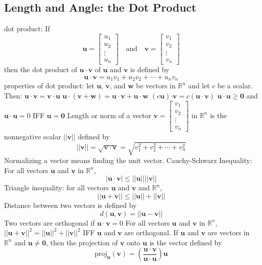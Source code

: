 \documentclass{article}
\begin{document}
    \subsection{Length and Angle: the Dot Product}
    \begin{outline}
        \1 dot product: If \[\mathbf u=\begin{bmatrix}u_1\\u_2\\\vdots\\u_n\end{bmatrix}\quad\text{and}\quad\mathbf v=\begin{bmatrix}v_1\\v_2\\\vdots\\v_n\end{bmatrix}\] then the dot product of \(\mathbf u\cdot\mathbf v\) of \(\mathbf u\) and \(\mathbf v\) is defined by \[\mathbf u\cdot\mathbf v=u_1v_1+u_2v_2+\cdots+u_nv_n\]
        \1 properties of dot product: let \(\mathbf u\), \(\mathbf v\), and \(\mathbf w\) be vectors in \(\mathbb R^n\) and let $c$ be a scalar. Then: 
            \2 \(\mathbf{u\cdot v}=\mathbf{v\cdot u}\)
            \2 \(\mathbf{u\cdot}(\mathbf{v+w})=\mathbf{u\cdot v+u\cdot w}\)
            \2 \((c\mathbf u)\mathbf{\cdot v}=c(\mathbf{u\cdot v})\)
            \2 \(\mathbf{u\cdot u\geq 0}\) and \(\mathbf{u\cdot u}=0\) IFF \(\mathbf u=\mathbf 0\)
            \2 Length or norm of a vector \(\mathbf v=\begin{bmatrix}v_1\\v_2\\\vdots\\v_n\end{bmatrix}\) in \(\mathbb R^n\) is the nonnegative scalar \(||\mathbf v||\) defined by \[||\mathbf v||=\sqrt{\mathbf{v\cdot v}}=\sqrt{v_1^2+v_2^2+\cdots+v_n^2}\]
        \1 Normalizing a vector means finding the unit vector. 
        \1 Cauchy-Schwarz Inequality: For all vectors \(\mathbf u\) and \(\mathbf v\) in \(\mathbb R^n\), \[|\mathbf{u\cdot v}|\leq ||\mathbf u||||\mathbf v||\]
        \1 Triangle inequality: for all vectors \(\mathbf u\) and \(\mathbf v\) and \(\mathbb R^n\), \[||\mathbf u+\mathbf v||\leq||\mathbf u||+||\mathbf v||\]
        \1 Distance between two vectors is defined by \[d(\mathbf u,\mathbf v)=||\mathbf u-\mathbf v||\]
        \1 Two vectors are orthogonal if \(\mathbf u\cdot\mathbf v=0\)
        \1 For all vectors \(\mathbf u\) and \(\mathbf v\) in \(\mathbb R^n\), \(||\mathbf u+\mathbf v||^2=||\mathbf u||^2+||\mathbf v||^2\) IFF \(\mathbf u\) and \(\mathbf v\) are orthogonal. 
        \1 If \(\mathbf u\) and \(\mathbf v\) are vectors in \(\mathbb R^n\) and \(\mathbf u\neq\mathbf 0\), then the projection of \(\mathbf v\) onto \(\mathbf u\) is the vector defined by \[\text{proj}_{\mathbf u}(\mathbf v)=\left(\dfrac{\mathbf{u\cdot v}}{\mathbf{u\cdot u}}\right)\mathbf u\]

    \end{outline}
\end{document}
